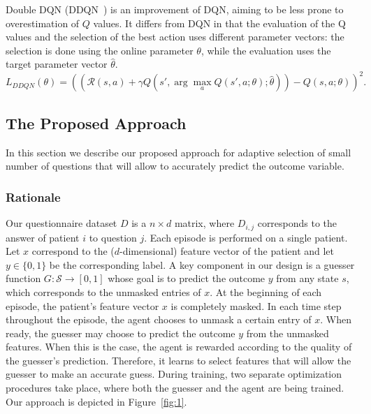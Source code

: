 \documentclass[reqno,11pt]{article}
\begin{document}
Double DQN (DDQN~\citep{van2016deep}) is an improvement of DQN, aiming to be less prone to overestimation of $Q$ values. It differs from DQN in that the evaluation of the Q values and the selection of the best action uses different parameter vectors: the selection is done using the online parameter $\theta$, while the evaluation uses the target parameter vector $\hat{\theta}$.
\begin{equation}
L_{DDQN}(\theta) = \left( \left(\mathcal{R}(s, a) + \gamma  Q(s', \arg\max_a Q(s', a; \theta); \hat{\theta})\right) - Q(s, a; \theta)\right)^2. \label{eq:ddqn}
\end{equation}


\subsection {The Proposed Approach}\label{sec:proposed}

In this section we describe our proposed approach for adaptive selection of small number of questions that will allow to accurately predict the outcome variable.

\subsubsection {Rationale}\label{sec:rationale}
Our questionnaire dataset $D$ is a $n \times d$ matrix, where $D_{i,j}$ corresponds to the answer of patient $i$ to question $j$. 
Each episode is performed on a single patient. 
Let $x$ correspond to the ($d$-dimensional) feature vector of the patient and let $y \in \{0,1\}$ be the corresponding label.
A key component in our design is a guesser function $G: \mathcal{S} \rightarrow [0,1]$  whose goal is to predict the outcome $y$ from any state $s$, which corresponds to the unmasked entries of $x$.
At the beginning of each episode, the patient's feature vector $x$ is completely masked. 
In each time step throughout the episode, the agent chooses to unmask a certain entry of $x$. 
When ready, the guesser may choose to predict the outcome $y$ from the unmasked features. 
When this is the case, the agent is rewarded according to the quality of the guesser's prediction. 
Therefore, it learns to select features that will allow the guesser to make an accurate guess.
During training, two separate optimization procedures take place, where both the guesser and the agent are being trained.
Our approach is depicted in Figure~\ref{fig:1}.
\end{document}

